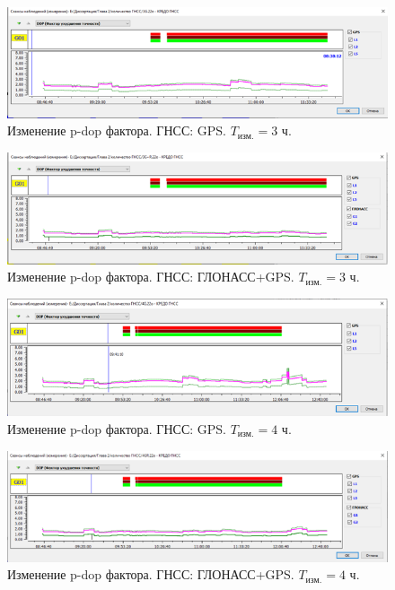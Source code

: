 \begin{figure}[!h]
	\centering
	\includegraphics[width=0.99\linewidth]{images/pic16}
	\caption{Изменение p-dop фактора. ГНСС: GPS. $T_{\text{изм.}}=3$ ч. }
	\label{fig:pic16}
\end{figure}

\begin{figure}[!h]
	\centering
	\includegraphics[width=0.99\linewidth]{images/pic17}
	\caption{Изменение p-dop фактора. ГНСС: ГЛОНАСС\thinspace +\thinspace GPS. $T_{\text{изм.}}=3$ ч. }
	\label{fig:pic17}
\end{figure}

\begin{figure}[!h]
	\centering
	\includegraphics[width=0.99\linewidth]{images/pic18}
	\caption{Изменение p-dop фактора. ГНСС: GPS. $T_{\text{изм.}}=4$ ч. }
	\label{fig:pic18}
\end{figure}

\begin{figure}[!h]
	\centering
	\includegraphics[width=0.99\linewidth]{images/pic19}
	\caption{Изменение p-dop фактора. ГНСС: ГЛОНАСС\thinspace +\thinspace GPS. $T_{\text{изм.}}=4$ ч. }
	\label{fig:pic19}
\end{figure}
	

